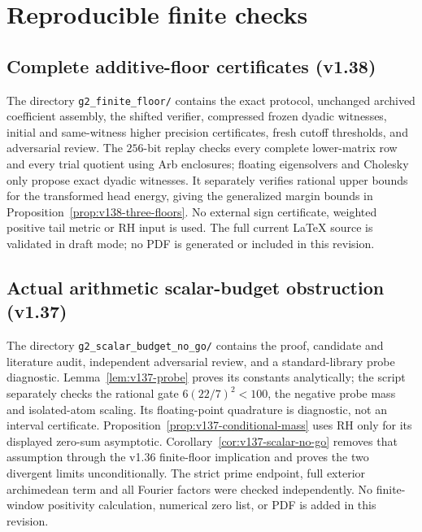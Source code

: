 \documentclass[11pt]{article}
\theoremstyle{remark}
\begin{document}
\appendix
\section{Reproducible finite checks}\label{app:numerics}

\subsection*{Complete additive-floor certificates (v1.38)}
The directory \texttt{g2\_finite\_floor/} contains the exact protocol,
unchanged archived coefficient assembly, the shifted verifier,
compressed frozen dyadic witnesses, initial and same-witness higher
precision certificates, fresh cutoff thresholds, and adversarial review.
The $256$-bit replay checks every complete lower-matrix row and every
trial quotient using Arb enclosures; floating eigensolvers and Cholesky
only propose exact dyadic witnesses. It separately verifies rational
upper bounds for the transformed head energy, giving the generalized
margin bounds in Proposition~\ref{prop:v138-three-floors}. No external
sign certificate, weighted positive tail metric or RH input is used.
The full current LaTeX source is validated in draft mode; no PDF is
generated or included in this revision.

\subsection*{Actual arithmetic scalar-budget obstruction (v1.37)}
The directory \texttt{g2\_scalar\_budget\_no\_go/} contains the proof,
candidate and literature audit, independent adversarial review, and a
standard-library probe diagnostic. Lemma~\ref{lem:v137-probe} proves its
constants analytically; the script separately checks the rational gate
$6(22/7)^2<100$, the negative probe mass and isolated-atom scaling.
Its floating-point quadrature is diagnostic, not an interval certificate.
Proposition~\ref{prop:v137-conditional-mass} uses RH only for its displayed
zero-sum asymptotic. Corollary~\ref{cor:v137-scalar-no-go} removes that
assumption through the v1.36 finite-floor implication and proves the two
divergent limits unconditionally. The strict prime endpoint, full exterior
archimedean term and all Fourier factors were checked independently.
No finite-window positivity calculation, numerical zero list, or PDF is
added in this revision.
\end{document}

